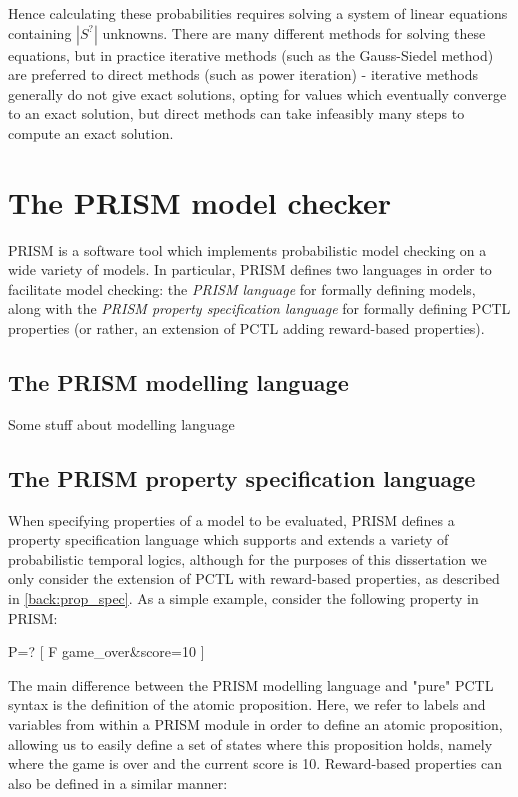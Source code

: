 Hence calculating these probabilities requires solving a system of linear equations containing $|S^{?}|$ unknowns. There are many different methods for solving these equations, but in practice iterative methods (such as the Gauss-Siedel method) are preferred to direct methods (such as power iteration) - iterative methods generally do not give exact solutions, opting for values which eventually converge to an exact solution, but direct methods can take infeasibly many steps to compute an exact solution.

\section{The PRISM model checker}
\label{back:PRISM}

PRISM is a software tool which implements probabilistic model checking on a wide variety of models. In particular, PRISM defines two languages in order to facilitate model checking: the \emph{PRISM language} for formally defining models, along with the \emph{PRISM property specification language} for formally defining PCTL properties (or rather, an extension of PCTL adding reward-based properties).

\subsection{The PRISM modelling language}
\label{back:PRISM-modelling}

Some stuff about modelling language

\subsection{The PRISM property specification language}
\label{back:PRISM-prop}

When specifying properties of a model to be evaluated, PRISM defines a property specification language which supports and extends a variety of probabilistic temporal logics, although for the purposes of this dissertation we only consider the extension of PCTL with reward-based properties, as described in \ref{back:prop_spec}. As a simple example, consider the following property in PRISM:

\begin{verbatim*}
    P=? [ F game_over&score=10 ]
\end{verbatim*}

The main difference between the PRISM modelling language and "pure" PCTL syntax is the definition of the atomic proposition. Here, we refer to labels and variables from within a PRISM module in order to define an atomic proposition, allowing us to easily define a set of states where this proposition holds, namely where the game is over and the current score is 10. Reward-based properties can also be defined in a similar manner:

